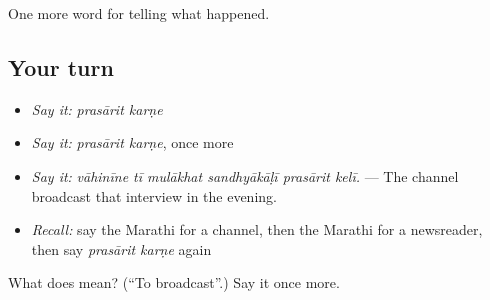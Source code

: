 \begin{grammarlens}[title={What you've built}]
One more word for telling what happened.
\end{grammarlens}

\subsection*{Your turn}
\begin{itemize}
\raggedright
  \item \emph{Say it:} \emph{prasārit karṇe}
  \item \emph{Say it:} \emph{prasārit karṇe}, once more
  \item \emph{Say it:} \emph{vāhinīne tī mulākhat sandhyākāḷī prasārit kelī.} — The channel broadcast that interview in the evening.
  \item \emph{Recall:} say the Marathi for a channel, then the Marathi for a newsreader, then say \emph{prasārit karṇe} again
\end{itemize}

\begin{tcolorbox}[breakable,colback=teal!4,colframe=teal!35!black,title={Before you move on}]
What does   mean? (\textquotedblleft{}To broadcast\textquotedblright{}.) Say it once more.
\end{tcolorbox}
